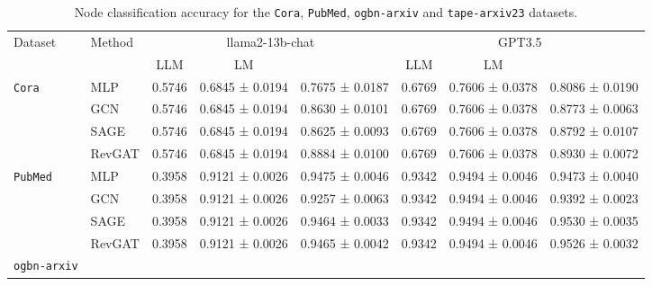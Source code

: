 \documentclass{article}
\begin{document}
\begin{table}[!ht]
    \caption{Node classification accuracy for the \texttt{Cora}, \texttt{PubMed}, \texttt{ogbn-arxiv} and \texttt{tape-arxiv23} datasets. }
\scriptsize
    \label{rebuttal tab: llama2}
    \centering
\begin{tabular}{llcccccc}
\toprule
    \multirow{2}{*}{Dataset}     
    & \multirow{2}{*}{Method}
    & \multicolumn{3}{c}{{llama2-13b-chat}} 
    & \multicolumn{3}{c}{{GPT3.5}}\\
    \cmidrule(lr){3-5}\cmidrule(lr){6-8}
    &  
    & {LLM} & {LM} & {}
    & LLM & LM & {}
    
    \\
    \midrule
         \multirow{3}{*}{\texttt{Cora}} 
         & MLP
         & {0.5746}
         & {0.6845 ± 0.0194}
         & 0.7675 ± 0.0187
         & 0.6769
         & 0.7606 ± 0.0378
         &0.8086 ± 0.0190
         \\
         & GCN 
         & {0.5746}
         & {0.6845 ± 0.0194}
         & 0.8630 ± 0.0101
         & 0.6769
         & 0.7606 ± 0.0378
         & 0.8773 ± 0.0063
         \\
         & SAGE
         & {0.5746}
         & {0.6845 ± 0.0194}
         & 0.8625 ± 0.0093
         & 0.6769
         & 0.7606 ± 0.0378
         & 0.8792 ± 0.0107
         \\
         & RevGAT
         & {0.5746}
         & {0.6845 ± 0.0194}
         & 0.8884 ± 0.0100
         & 0.6769
         & 0.7606 ± 0.0378
         & 0.8930 ± 0.0072
         \\
         \midrule
    \multirow{3}{*}{\texttt{PubMed}} 
        & MLP
        & {0.3958}
         & {0.9121 ± 0.0026}
         & 0.9475 ± 0.0046
         & 0.9342
         & 0.9494 ± 0.0046
         & 0.9473 ± 0.0040
         \\
         & GCN 
         & {0.3958}
         & {0.9121 ± 0.0026}
         & 0.9257 ± 0.0063
         & 0.9342
         & 0.9494 ± 0.0046
         & 0.9392 ± 0.0023
         \\
         & SAGE
         & {0.3958}
         & {0.9121 ± 0.0026}
         & 0.9464 ± 0.0033
         & 0.9342
         & 0.9494 ± 0.0046
         & 0.9530 ± 0.0035
         \\
         & RevGAT
         & {0.3958}
         & {0.9121 ± 0.0026}
         & 0.9465 ± 0.0042
         & 0.9342
         & 0.9494 ± 0.0046
         & 0.9526 ± 0.0032
         \\
         \midrule
    \multirow{3}{*}{\texttt{ogbn-arxiv}}

\end{tabular}
\end{table}
\end{document}
